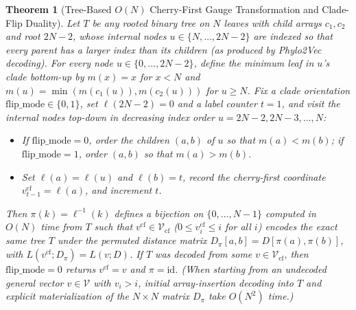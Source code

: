 \documentclass[11pt,a4paper]{article}
\newtheorem{theorem}{Theorem}[section]
\theoremstyle{definition}
\begin{document}
\begin{theorem}[Tree-Based $O(N)$ Cherry-First Gauge Transformation and Clade-Flip Duality]
\label{thm:relabel}
Let $T$ be any rooted binary tree on $N$ leaves with child arrays $c_1, c_2$ and root $2N-2$, whose internal nodes $u \in \{N, \dots, 2N-2\}$ are indexed so that every parent has a larger index than its children (as produced by Phylo2Vec decoding). For every node $u \in \{0, \dots, 2N-2\}$, define the minimum leaf in $u$'s clade bottom-up by $m(x) = x$ for $x < N$ and $m(u) = \min(m(c_1(u)), m(c_2(u)))$ for $u \ge N$. Fix a clade orientation $\text{flip\_mode} \in \{0, 1\}$, set $\ell(2N-2) = 0$ and a label counter $t = 1$, and visit the internal nodes top-down in decreasing index order $u = 2N-2, 2N-3, \dots, N$:
\begin{itemize}
    \item If $\text{flip\_mode} = 0$, order the children $(a, b)$ of $u$ so that $m(a) < m(b)$; if $\text{flip\_mode} = 1$, order $(a, b)$ so that $m(a) > m(b)$.
    \item Set $\ell(a) = \ell(u)$ and $\ell(b) = t$, record the cherry-first coordinate $v^{\text{cf}}_{t-1} = \ell(a)$, and increment $t$.
\end{itemize}
Then $\pi(k) = \ell^{-1}(k)$ defines a bijection on $\{0, \dots, N-1\}$ computed in $O(N)$ time from $T$ such that $v^{\text{cf}} \in \mathcal{V}_{\text{cf}}$ ($0 \le v^{\text{cf}}_i \le i$ for all $i$) encodes the exact same tree $T$ under the permuted distance matrix $D_\pi[a, b] = D[\pi(a), \pi(b)]$, with $L(v^{\text{cf}}; D_\pi) = L(v; D)$. If $T$ was decoded from some $v \in \mathcal{V}_{\text{cf}}$, then $\text{flip\_mode} = 0$ returns $v^{\text{cf}} = v$ and $\pi = \text{id}$. (When starting from an undecoded general vector $v \in \mathcal{V}$ with $v_i > i$, initial array-insertion decoding into $T$ and explicit materialization of the $N \times N$ matrix $D_\pi$ take $O(N^2)$ time.)
\end{theorem}
\end{document}
